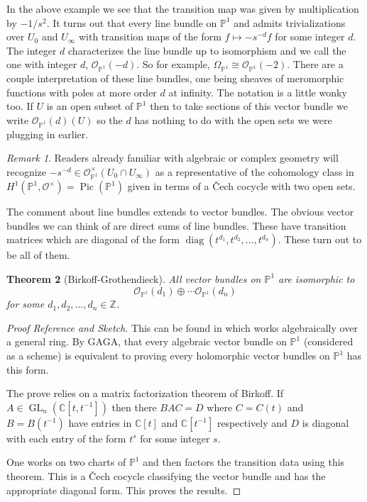 \documentclass[12pt]{book}
\numberwithin{equation}{section}
\newtheorem{theorem}{Theorem}[subsection]
\theoremstyle{definition}
\theoremstyle{remark}
\newtheorem{remark}[theorem]{Remark}
\newcommand{\ZZ}{\mathbb{Z}}
\newcommand{\CC}{\mathbb{C}}
\newcommand{\PP}{\mathbb{P}}
\newcommand{\Ocal}{\mathcal{O}}
\newcommand{\GL}{\operatorname{GL}}
\newcommand{\Pic}{\operatorname{Pic}}
\begin{document}
In the above example we see that the transition map was given by multiplication by $-1/s^2$. 
It turns out that every line bundle on $\PP^1$ and admits trivializations over $U_0$ and $U_{\infty}$ with transition maps of  the form $f \mapsto -s^{-d} f$ for some integer $d$. 
The integer $d$ characterizes the line bundle up to isomorphism and we call the one with integer $d$, $\Ocal_{\PP^1}(-d)$. 
So for example, $\Omega_{\PP^1} \cong \Ocal_{\PP^1}(-2)$. 
There are a couple interpretation of these line bundles, one being sheaves of meromorphic functions with poles at more order $d$ at infinity. 
The notation is a little wonky too. 
If $U$ is an open subset of $\PP^1$ then to take sections of this vector bundle we write $\Ocal_{\PP^1}(d)(U)$ so the $d$ has nothing to do with the open sets we were plugging in earlier. 
\begin{remark}
	Readers already familiar with algebraic or complex geometry will recognize $-s^{-d} \in \Ocal^{\times}_{\PP^1}(U_0 \cap U_{\infty})$ as a representative of the cohomology class  in $H^1(\PP^1,\Ocal^{\times}) = \Pic(\PP^1)$ given in terms of a \v{C}ech cocycle with two open sets. 
\end{remark}
The comment about line bundles extends to vector bundles. 
The obvious vector bundles we can think of are direct sums of line bundles. 
These have transition matrices which are diagonal of the form $\operatorname{diag}(t^{d_1},t^{d_2},\ldots,t^{d_n}).$
These turn out to be all of them.

\begin{theorem}[Birkoff-Grothendieck]
	All vector bundles on $\PP^1$ are isomorphic to 
	$$ \Ocal_{\PP^1}(d_1) \oplus \cdots \Ocal_{\PP^1}(d_n) $$
	for some $d_1,d_2,\ldots,d_n \in \ZZ$.
\end{theorem}
\begin{proof}[Proof Reference and Sketch]
	This can be found in \cite{Hazewinkel1982} which works algebraically over a general ring. 
	By GAGA, that every algebraic vector bundle on $\PP^1$ (considered as a scheme) is equivalent to proving every holomorphic vector bundles on $\PP^1$ has this form.
	
	The prove relies on a matrix factorization theorem of Birkoff.
	If $A \in \GL_n(\CC[t,t^{-1}])$ then there $BAC=D$ where $C=C(t)$ and $B=B(t^{-1})$  have entries in $\CC[t]$ and $\CC[t^{-1}]$ respectively and $D$ is diagonal with each entry of the form $t^s$ for some integer $s$.
	
	One works on two charts of $\PP^1$ and then factors the transition data using this theorem. 
	This is a \v{C}ech cocycle classifying the vector bundle and has the appropriate diagonal form.
	This proves the results.
\end{proof}
\end{document}

